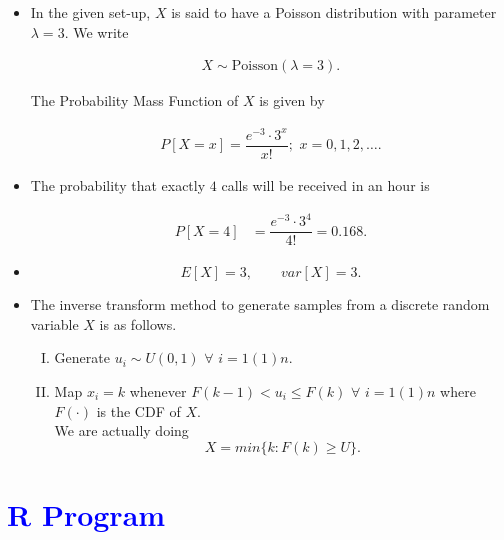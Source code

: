 \documentclass[11pt, a4paper]{article}\usepackage[]{graphicx}\usepackage[]{xcolor}
\begin{document}
\begin{itemize}
\item[\scalebox{2.0}{\twemoji{keycap: 1}}] \hspace{0.1cm} In the given set-up, $X$ is said to have a Poisson distribution with parameter $\lambda = 3$. We write

\begin{align*}
X \sim \text{Poisson}(\lambda = 3).
\end{align*}

The Probability Mass Function of $X$ is given by

\begin{align*}
P[X = x] = \dfrac{e^{-3} \cdot 3^x}{x !}; \,\, x = 0, 1, 2, \ldots.
\end{align*}

\item[\scalebox{2.0}{\twemoji{keycap: 2}}] \hspace{0.1cm} The probability that exactly $4$ calls will be received in an hour is

\begin{align*}
P[X = 4] &= \dfrac{e^{-3} \cdot 3^4}{4 !} = 0.168.
\end{align*}

\item[\scalebox{2.0}{\twemoji{keycap: 3}}] \hspace{0.1cm} $$E[X] = 3, \qquad var[X] = 3.$$

\newpage

\item[\scalebox{2.0}{\twemoji{keycap: 4}}] \hspace{0.1cm} The inverse transform method to generate samples from a discrete random variable $X$ is as follows.
\begin{enumerate}[I.]
\item Generate $u_i \sim U(0, 1)$ $\forall$ $i = 1(1)n$.
\item Map $x_i = k$ whenever $F(k-1) < u_i \leq F(k)$ $\forall$ $i = 1(1)n$ where $F(\cdot)$ is the CDF of $X$. \\[0.35em] We are actually doing $$X = min\{k : F(k) \geq U\}.$$
\end{enumerate}
\end{itemize}

\section*{\faArrowAltCircleRight[regular] \textcolor{blue}{R Program}}
\end{document}
